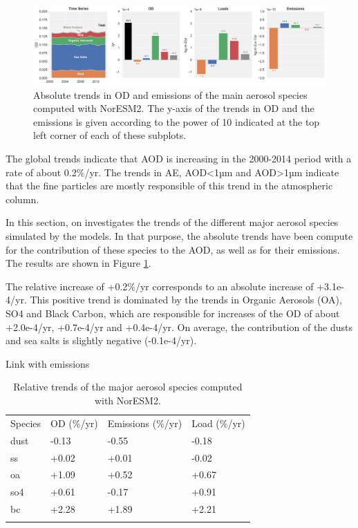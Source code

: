\documentclass[journal abbreviation, manuscript]{copernicus}
\begin{document}
\begin{figure}[t]
 \includegraphics[width=16cm]{../scripts/figs/abs_species_trends.png}
 \caption{Absolute trends in OD and emissions of the main aerosol species computed with NorESM2. The y-axis of the trends in OD and the emissions is given according to the power of 10 indicated at the top left corner of each of these subplots.}
 \label{fig:species}
\end{figure}

The global trends indicate that AOD is increasing in the 2000-2014 period with a rate of about 0.2\%/yr. The trends in AE, AOD<1µm and AOD>1µm indicate that the fine particles are mostly responsible of this trend in the atmospheric column.

In this section, on investigates the trends of the different major aerosol species simulated by the models. In that purpose, the absolute trends have been compute for the contribution of these species to the AOD, as well as for their emissions. The results are shown in Figure \ref{fig:species}.

The relative increase of +0.2\%/yr corresponds to an absolute increase of +3.1e-4/yr. This positive trend is dominated by the trends in Organic Aerosols (OA), SO4 and Black Carbon, which are responsible for increases of the OD of about +2.0e-4/yr, +0.7e-4/yr and +0.4e-4/yr. On average, the contribution of the dusts and sea salts is slightly negative (-0.1e-4/yr).

Link with emissions

\begin{table}[]
 \centering
\begin{tabular}{llll}
\tophline
Species & OD (\%/yr) & Emissions (\%/yr) & Load (\%/yr) \\
\middlehline
   dust &      -0.13 &             -0.55 &        -0.18 \\
     ss &      +0.02 &             +0.01 &        -0.02 \\
     oa &      +1.09 &             +0.52 &        +0.67 \\
    so4 &      +0.61 &             -0.17 &        +0.91 \\
     bc &      +2.28 &             +1.89 &        +2.21 \\
\bottomhline
\end{tabular}
 \caption{Relative trends of the major aerosol species computed with NorESM2.}
 \label{tab:species}
\end{table}
\end{document}
